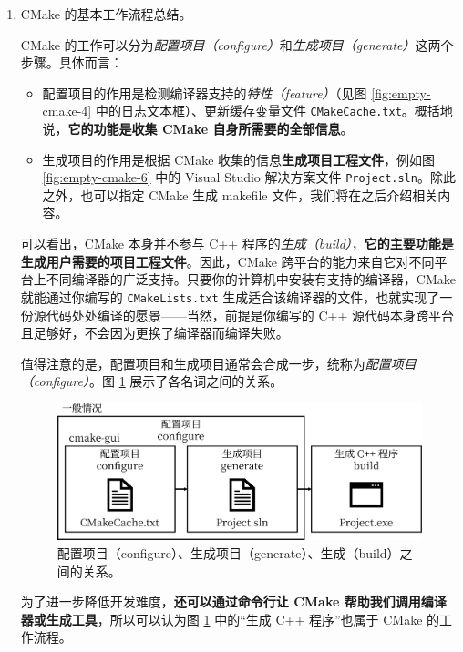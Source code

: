 \begin{enumerate}
	\item CMake 的基本工作流程总结。

	CMake 的工作可以分为\emph{配置项目（configure）}和\emph{生成项目（generate）}这两个步骤。具体而言：

	\begin{itemize}
		\item 配置项目的作用是检测编译器支持的\emph{特性（feature）}（见图 \ref{fig:empty-cmake-4} 中的日志文本框）、更新缓存变量文件 \lstinline[language={}]{CMakeCache.txt}。概括地说，\textbf{它的功能是收集 CMake 自身所需要的全部信息}。

		\item 生成项目的作用是根据 CMake 收集的信息\textbf{生成项目工程文件}，例如图 \ref{fig:empty-cmake-6} 中的 Visual Studio 解决方案文件 \lstinline[language={}]{Project.sln}。除此之外，也可以指定 CMake 生成 makefile 文件，我们将在之后介绍相关内容。 %
	\end{itemize}

	可以看出，CMake 本身并不参与 C++ 程序的\emph{生成（build）}，\textbf{它的主要功能是生成用户需要的项目工程文件}。因此，CMake 跨平台的能力来自它对不同平台上不同编译器的广泛支持。只要你的计算机中安装有支持的编译器，CMake 就能通过你编写的 \lstinline[language={}]{CMakeLists.txt} 生成适合该编译器的文件，也就实现了一份源代码处处编译的愿景——当然，前提是你编写的 C++ 源代码本身跨平台且足够好，不会因为更换了编译器而编译失败。

	值得注意的是，配置项目和生成项目通常会合成一步，统称为\emph{配置项目（configure）}。图 \ref{fig:configure} 展示了各名词之间的关系。

	\begin{figure}[t]
		\centering
		\includegraphics[scale=0.15]{assets/configure}
		\caption{配置项目（configure）、生成项目（generate）、生成（build）之间的关系。}
		\label{fig:configure}
	\end{figure}

	为了进一步降低开发难度，\textbf{还可以通过命令行让 CMake 帮助我们调用编译器或生成工具}，所以可以认为图 \ref{fig:configure} 中的“生成 C++ 程序”也属于 CMake 的工作流程。


\end{enumerate}
